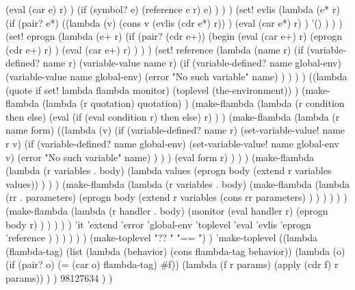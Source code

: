 \begin{code:lisp}
                            (eval (car e) r) )
                           (if (symbol? e) (reference e r) e) ) ) )
               (set! evlis
                     (lambda (e* r)
                       (if (pair? e*)
                           ((lambda (v)
                              (cons v (evlis (cdr e*) r)) )
                            (eval (car e*) r) )
                           '() ) ) )
               (set! eprogn
                     (lambda (e+ r)
                       (if (pair? (cdr e+))
                           (begin (eval (car e+) r)
                                  (eprogn (cdr e+) r) )
                           (eval (car e+) r) ) ) )
               (set! reference
                     (lambda (name r)
                       (if (variable-defined? name r)
                           (variable-value name r)
                           (if (variable-defined? name global-env)
                               (variable-value name global-env)
                               (error "No such variable" name) ) ) ) )
               ((lambda (quote if set! lambda flambda monitor)
                  (toplevel (the-environment)) )
                (make-flambda
                 (lambda (r quotation) quotation) )
                (make-flambda
                 (lambda (r condition then else)
                   (eval (if (eval condition r) then else) r) ) )
                (make-flambda
                 (lambda (r name form)
                   ((lambda (v)
                      (if (variable-defined? name r)
                          (set-variable-value! name r v)
                          (if (variable-defined? name global-env)
                              (set-variable-value! name global-env v)
                              (error "No such variable" name) ) ) )
                    (eval form r) ) ) )
                (make-flambda
                 (lambda (r variables . body)
                   (lambda values
                     (eprogn body (extend r variables values)) ) ) )
                (make-flambda
                 (lambda (r variables . body)
                   (make-flambda
                    (lambda (rr . parameters)
                      (eprogn body
                              (extend r variables
                                      (cons rr parameters) ) ) ) ) ) )
                (make-flambda
                 (lambda (r handler . body)
                   (monitor (eval handler r)
                     (eprogn body r) ) ) ) ) )
             'it 'extend 'error 'global-env 'toplevel
             'eval 'evlis 'eprogn 'reference ) ) ) ) ) )
   (make-toplevel "?? " "== ") )
 'make-toplevel
 ((lambda (flambda-tag)
    (list (lambda (behavior) (cons flambda-tag behavior))
          (lambda (o) (if (pair? o) (= (car o) flambda-tag) #f))
          (lambda (f r params) (apply (cdr f) r params)) ) )
  98127634 ) )
\end{code:lisp}

